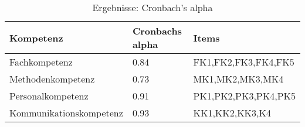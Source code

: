 \begin{table}[H]
\centering
\caption{Ergebnisse: Cronbach's alpha}
\label{cronbach}
\begin{tabular}{@{}lll@{}}
\toprule
Kompetenz               & Cronbachs alpha & Items               \\ \midrule
Fachkompetenz           & 0.84            & FK1,FK2,FK3,FK4,FK5 \\
Methodenkompetenz       & 0.73            & MK1,MK2,MK3,MK4     \\
Personalkompetenz       & 0.91            & PK1,PK2,PK3,PK4,PK5 \\
Kommunikationskompetenz & 0.93            & KK1,KK2,KK3,K4      \\ \bottomrule
\end{tabular}
\end{table}